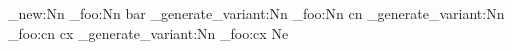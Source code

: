 \cs_new:Nn
  \module_foo:Nn
  { bar }
\cs_generate_variant:Nn
  \module_foo:Nn
  { cn }
\cs_generate_variant:Nn
  \module_foo:cn
  { cx }
\cs_generate_variant:Nn  %
  \module_foo:cx
  { Ne }
